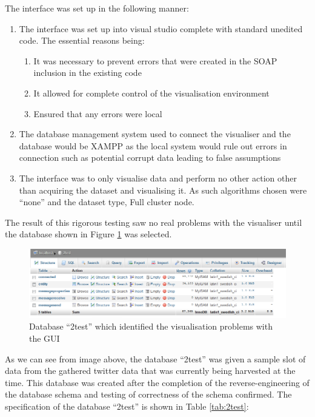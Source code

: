 The interface was set up in the following manner:
\begin{enumerate}
	\item The interface was set up into visual studio complete with standard
unedited code. The essential reasons being:
	
	\begin{enumerate}
		\item It was necessary to prevent errors that were created in the SOAP inclusion in the existing code
		
		\item It allowed for complete control of the visualisation environment
		
		\item Ensured that any errors were local
	\end{enumerate}
	
	\item The database management system used to connect the visualiser and the database would be XAMPP as the local system would rule out errors in connection such as potential corrupt data leading to false assumptions
	
	\item The interface was to only visualise data and perform no other action other than acquiring the dataset and visualising it. As such algorithms chosen were ``none'' and the dataset type, Full cluster node.
\end{enumerate}

The result of this rigorous testing saw no real problems with the visualiser until the database shown in Figure \ref{fig:2test} was selected. 

\begin{figure}[htbp]%
\centering
\includegraphics[width=0.5\columnwidth]{./img/2test}%
\caption{Database ``2test'' which identified 
the visualisation problems with the GUI
}%
\label{fig:2test}%
\end{figure}

As we can see from image above, the database ``2test'' was given a sample slot of data from the gathered twitter data that was currently being harvested at the time. This database was created after the completion of the reverse-engineering of the database schema and testing of correctness of the schema confirmed. The specification of the database ``2test'' is shown in Table \ref{tab:2test}:

